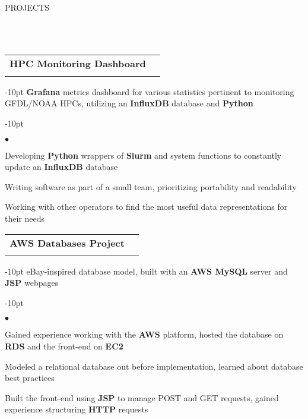 \documentclass[12pt]{article}
\makeatletter
\newcommand{\header}[1]{
	\vspace*{12pt} %
	{\hspace*{-14pt}\vspace*{6pt} #1}
	\vspace*{-6pt} 
	\lineunder
}
\newcommand{\lineunder}{
	\vspace*{-8pt} \\ 
	\hspace*{-18pt} 
	\hrulefill \\
}
\newcommand{\subheading}[4]{
 	\vspace{5pt}
    	\begin{tabular*}{1.01\textwidth}
    		{l@{\extracolsep{\fill}}r}
      		\hspace{-16pt}\textbf{#1} & #2 \\
      		\hspace{-16pt}\textit{\small#3} & \textit{\small #4} \\
    	\end{tabular*}
    \vspace{-4pt}
}
\newenvironment{achievements}{
\begin{adjustwidth}{-10pt}{}
  \begin{list}{$\bullet$}{
  	\topsep 0pt \itemsep -4pt}}
  	{\vspace*{2pt}\end{list}
\end{adjustwidth}
}
\makeatother
\begin{document}
\header{PROJECTS}


\subheading{HPC Monitoring Dashboard}{}{}{}
	\vspace{-15pt}
	\begin{adjustwidth}{-10pt}{}
	\textbf{Grafana} metrics dashboard for various statistics pertinent to monitoring GFDL/NOAA HPCs, utilizing an \textbf{InfluxDB} database and \textbf{Python}
	\end{adjustwidth}
	\begin{achievements}
		\item Developing \textbf{Python} wrappers of \textbf{Slurm} and system functions to constantly update an \textbf{InfluxDB} database
		\item Writing software as part of a small team, prioritizing portability and readability
		\item Working with other operators to find the most useful data representations for their needs
	\end{achievements}

\subheading{AWS Databases Project}{}{}{}
	\vspace{-15pt}
	\begin{adjustwidth}{-10pt}{}
	eBay-inspired database model, built with an \textbf{AWS MySQL} server and \textbf{JSP} webpages
	\end{adjustwidth}
	\begin{achievements}
		\item Gained experience working with the \textbf{AWS} platform, hosted the database on \textbf{RDS} and the front-end on \textbf{EC2}
		\item Modeled a relational database out before implementation, learned about database best practices
		\item Built the front-end using \textbf{JSP} to manage POST and GET requests, gained experience structuring \textbf{HTTP} requests
	\end{achievements}
	
\end{document}
